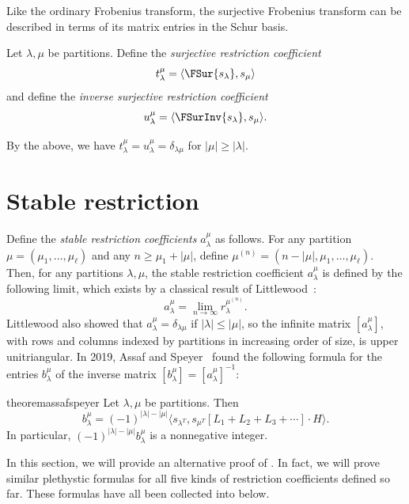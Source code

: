 Like the ordinary Frobenius transform, the surjective Frobenius transform can be described in terms of its matrix entries in the Schur basis.
\begin{defi}
Let $\lambda, \mu$ be partitions. Define the \emph{surjective restriction coefficient} \[t_\lambda^\mu = \langle \FSur{s_\lambda}, s_\mu\rangle\] and define the \emph{inverse surjective restriction coefficient} \[u_\lambda^\mu = \langle \FSurInv{s_\lambda}, s_\mu\rangle.\]
\end{defi}
By the above, we have $t_\lambda^\mu = u_\lambda^\mu = \delta_{\lambda \mu}$ for $|\mu| \geq |\lambda|$.
\section{Stable restriction}
\label{section:stable}
Define the \emph{stable restriction coefficients} $a_\lambda^\mu$ as follows. For any partition $\mu = (\mu_1, \ldots, \mu_\ell)$ and any $n \geq \mu_1 + |\mu|$, define $\mu^{(n)} = (n - |\mu|, \mu_1, \ldots, \mu_\ell)$. Then, for any partitions $\lambda, \mu$, the stable restriction coefficient $a_\lambda^\mu$ is defined by the following limit, which exists by a classical result of Littlewood~\cite{MR1576896}: \[a_\lambda^\mu = \lim_{n \to \infty} r_{\lambda}^{\mu^{(n)}}.\] Littlewood also showed that $a_{\lambda}^\mu = \delta_{\lambda \mu}$ if $|\lambda| \leq |\mu|$, so the infinite matrix $[a_\lambda^\mu]$, with rows and columns indexed by partitions in increasing order of size, is upper unitriangular. In 2019, Assaf and Speyer~\cite{MR4055931} found the following formula for the entries $b_\lambda^\mu$ of the inverse matrix $[b_\lambda^\mu] = [a_\lambda^\mu]^{-1}$:
\begin{restatable}[{\cite[Theorem~2]{MR4055931}}]{theorem}{assafspeyer}
\label{theorem:assafspeyer}
Let $\lambda, \mu$ be partitions. Then \[b_\lambda^\mu = (-1)^{|\lambda| - |\mu|} \langle s_{\lambda^T}, s_{\mu^T}[L_1 + L_2 + L_3 + \cdots] \cdot H \rangle.\] In particular, $(-1)^{|\lambda| - |\mu|}b_\lambda^\mu$ is a nonnegative integer.
\end{restatable}
In this section, we will provide an alternative proof of . In fact, we will prove similar plethystic formulas for all five kinds of restriction coefficients defined so far. These formulas have all been collected into  below.

